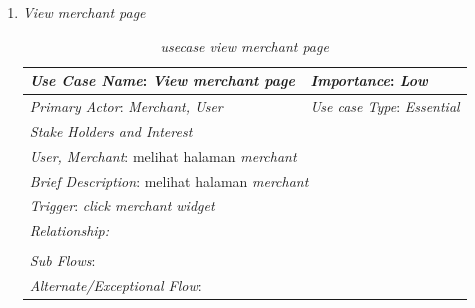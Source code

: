 \documentclass[a4paper]{article}
\begin{document}
\begin{enumerate}
\begin{enumerate}
        \item \textit{View merchant page}
\begin{table}[h]
    \centering
    \caption{\textit{usecase view merchant page} }
    \begin{tabular}{|lll}
    \hline
    \multicolumn{1}{|l|}{\textit{Use Case Name}: \textit{View merchant page}}             & \multicolumn{2}{l|}{\textit{Importance}: \textit{Low}}   \\ \hline
    \multicolumn{1}{|l|}{\textit{Primary Actor}: \textit{Merchant, User}}             & \multicolumn{2}{l|}{\textit{Use case Type}: \textit{Essential}} \\ \hline
    \multicolumn{1}{|l|}{\textit{Stake Holders and Interest}} &                               &                               \\ \cline{1-1}
    \multicolumn{1}{|l|}{\textit{User, Merchant}: melihat halaman \textit{merchant}}                                                     &                               &                               \\ \hline
    \multicolumn{3}{|l|}{\textit{Brief Description}: melihat halaman \textit{merchant}}                                                                         \\ \hline
    \multicolumn{3}{|l|}{\textit{Trigger}: \textit{click merchant widget}}                                                                                   \\ \hline
    \multicolumn{3}{|l|}{\textit{Relationship:}}                                                                              \\ \hline
    \multicolumn{3}{|l|}{}                                                                                                                     \\ \hline
    \multicolumn{3}{|l|}{\textit{Sub Flows}:}                                                                                 \\ \hline
    \multicolumn{3}{|l|}{\textit{Alternate/Exceptional Flow}:}                                                                \\ \hline
    \end{tabular}
\end{table}


\end{enumerate}
\end{enumerate}
\end{document}
